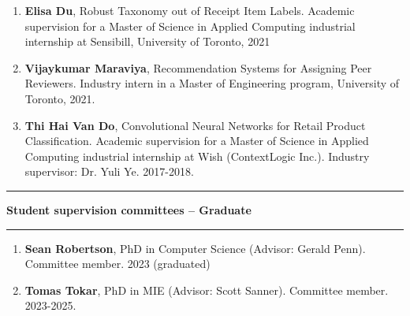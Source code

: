 \documentclass[letterpaper,11pt]{article}
\newcommand{\resheading}[1]{%
  \vspace{10pt}%
  \noindent\textcolor{accent}{\rule{3pt}{12pt}}\hspace{6pt}%
  {\large \textbf{\textcolor{accent}{#1}}}%
  \vspace{2pt}%
  \par\noindent\textcolor{accent!30}{\rule{\textwidth}{0.5pt}}%
  \vspace{2pt}%
}
\begin{document}
\begin{enumerate}
\item
	\textbf{Elisa Du}, Robust Taxonomy out of Receipt Item Labels.  Academic supervision for a Master of Science in Applied Computing industrial internship at Sensibill, University of Toronto, 2021 

\item
	\textbf{Vijaykumar Maraviya}, Recommendation Systems for Assigning Peer Reviewers. Industry intern in a Master of Engineering program, University of Toronto, 2021.
\item
	\textbf{Thi Hai Van Do}, Convolutional Neural Networks for Retail Product Classification. Academic supervision for a Master of Science in Applied Computing industrial internship at Wish (ContextLogic Inc.). Industry supervisor: Dr. Yuli Ye. 2017-2018.

\end{enumerate}

\resheading{Student supervision committees -- Graduate}
\begin{enumerate}
	\item \textbf{Sean Robertson}, PhD in Computer Science (Advisor: Gerald Penn). Committee member. 2023 (graduated)
	\item \textbf{Tomas Tokar}, PhD in MIE (Advisor: Scott Sanner). Committee member. 2023-2025.

\end{enumerate}
\end{document}
